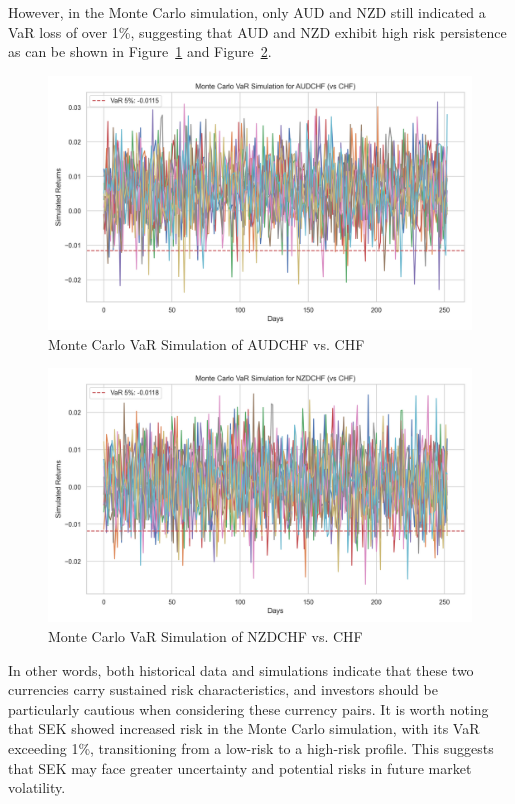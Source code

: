 \documentclass[a4paper, 12pt]{article}
\begin{document}
However, in the Monte Carlo simulation, only AUD and NZD still indicated a VaR loss of over 1\%, suggesting that AUD and NZD exhibit high risk persistence as can be shown in Figure~\ref{fig:monte_carlo_var_simulation_AUDCHF_vs_CHF} and Figure~\ref{fig:monte_carlo_var_simulation_NZDCHF_vs_CHF}.

\begin{figure}[h]
    \centering   
    \includegraphics[width=0.75\linewidth]{reports/figures/monte_carlo_var_simulation_AUDCHF_vs_CHF.png}
    \caption{Monte Carlo VaR Simulation of AUDCHF vs. CHF}  \label{fig:monte_carlo_var_simulation_AUDCHF_vs_CHF}
\end{figure}

\begin{figure}[h]
    \centering
    \includegraphics[width=0.75\linewidth]{reports/figures/monte_carlo_var_simulation_NZDCHF_vs_CHF.png}
    \caption{Monte Carlo VaR Simulation of NZDCHF vs. CHF}  \label{fig:monte_carlo_var_simulation_NZDCHF_vs_CHF}
\end{figure}

In other words, both historical data and simulations indicate that these two currencies carry sustained risk characteristics, and investors should be particularly cautious when considering these currency pairs. It is worth noting that SEK showed increased risk in the Monte Carlo simulation, with its VaR exceeding 1\%, transitioning from a low-risk to a high-risk profile. This suggests that SEK may face greater uncertainty and potential risks in future market volatility.
\end{document}
